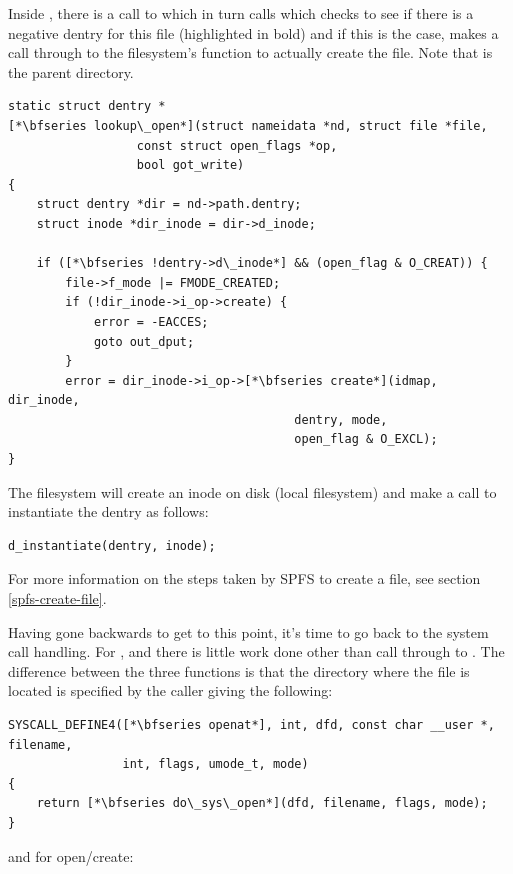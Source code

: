 \noindent
Inside , there is a call to  which in turn calls  which checks to see if there is a negative dentry for this file (highlighted in bold) and if this is the case, makes a call through to the filesystem's  function to actually create the file. Note that  is the parent directory.

\begin{lstlisting}
static struct dentry *
[*\bfseries lookup\_open*](struct nameidata *nd, struct file *file,
                  const struct open_flags *op,
                  bool got_write)
{
    struct dentry *dir = nd->path.dentry;
    struct inode *dir_inode = dir->d_inode;

    if ([*\bfseries !dentry->d\_inode*] && (open_flag & O_CREAT)) {
        file->f_mode |= FMODE_CREATED;
        if (!dir_inode->i_op->create) {
            error = -EACCES;
            goto out_dput;
        }
        error = dir_inode->i_op->[*\bfseries create*](idmap, dir_inode, 
                                        dentry, mode, 
                                        open_flag & O_EXCL);
}
\end{lstlisting}

\noindent
The filesystem will create an inode on disk (local filesystem) and make a call to instantiate the dentry as follows:

\begin{lstlisting}
d_instantiate(dentry, inode);
\end{lstlisting}

\noindent
For more information on the steps taken by SPFS to create a file, see section \ref{spfs-create-file}.

Having gone backwards to get to this point, it's time to go back to the system call handling. For ,  and  there is little work done other than call through to . The difference between the three functions is that the directory where the file is located is specified by the caller giving the following:

\begin{lstlisting}
SYSCALL_DEFINE4([*\bfseries openat*], int, dfd, const char __user *, filename, 
                int, flags, umode_t, mode)
{ 
    return [*\bfseries do\_sys\_open*](dfd, filename, flags, mode);
}    
\end{lstlisting}

\noindent
and for open/create:

